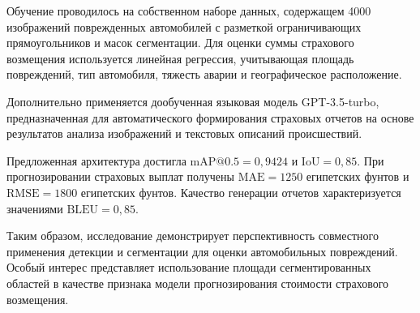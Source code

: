 \documentclass[12pt,a4paper]{article}
\begin{document}
Обучение проводилось на собственном наборе данных,
содержащем 4000 изображений поврежденных автомобилей
с разметкой ограничивающих прямоугольников и масок
сегментации. Для оценки суммы страхового возмещения
используется линейная регрессия, учитывающая площадь
повреждений, тип автомобиля, тяжесть аварии
и географическое расположение.

Дополнительно применяется дообученная языковая модель
GPT-3.5-turbo, предназначенная для автоматического
формирования страховых отчетов на основе результатов
анализа изображений и текстовых описаний происшествий.

Предложенная архитектура достигла
$\mathrm{mAP@0.5}=0{,}9424$ и $\mathrm{IoU}=0{,}85$.
При прогнозировании страховых выплат получены
$\mathrm{MAE}=1250$ египетских фунтов и
$\mathrm{RMSE}=1800$ египетских фунтов.
Качество генерации отчетов характеризуется значениями
$\mathrm{BLEU}=0{,}85$.

Таким образом, исследование демонстрирует перспективность
совместного применения детекции и сегментации для оценки
автомобильных повреждений. Особый интерес представляет
использование площади сегментированных областей
в качестве признака модели прогнозирования стоимости
страхового возмещения.
\end{document}
